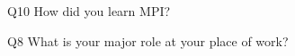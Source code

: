 \begin{description}%
\item{Q10} How did you learn MPI?%
\item{Q8} What is your major role at your place of work?%
\end{description}%
